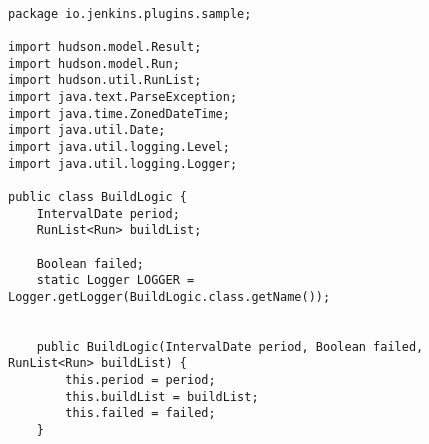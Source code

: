 \begin{lstlisting}

package io.jenkins.plugins.sample;

import hudson.model.Result;
import hudson.model.Run;
import hudson.util.RunList;
import java.text.ParseException;
import java.time.ZonedDateTime;
import java.util.Date;
import java.util.logging.Level;
import java.util.logging.Logger;

public class BuildLogic {
    IntervalDate period;
    RunList<Run> buildList;

    Boolean failed;
    static Logger LOGGER = Logger.getLogger(BuildLogic.class.getName());


    public BuildLogic(IntervalDate period, Boolean failed, RunList<Run> buildList) {
        this.period = period;
        this.buildList = buildList;
        this.failed = failed;
    }


\end{lstlisting}
